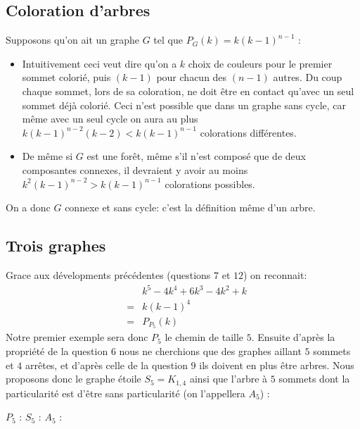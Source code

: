 \subsection{Coloration d'arbres}
Supposons qu'on ait un graphe $G$ tel que $P_G(k) = k(k-1)^{n-1}$ :
\begin {itemize}
\item Intuitivement ceci veut dire qu'on a $k$ choix de couleurs pour le premier sommet colorié, puis $(k-1)$ pour chacun des $(n-1)$ autres. Du coup chaque sommet, lors de sa coloration, ne doit être en contact qu'avec un seul sommet déjà colorié. Ceci n'est possible que dans un graphe sans cycle, car même avec un seul cycle on aura au plus $k(k-1)^{n-2}(k-2) < k(k-1)^{n-1}$ colorations différentes.
\item De même si $G$ est une forêt, même s'il n'est composé que de deux composantes connexes, il devraient y avoir au moins $k^2(k-1)^{n-2} > k(k-1)^{n-1}$ colorations possibles.
\end {itemize}
On a donc $G$ connexe et sans cycle: c'est la définition même d'un arbre.

\subsection{Trois graphes}
Grace aux dévelopments précédentes (questions $7$ et $12$) on reconnait:
\begin{eqnarray*}
&&		k^5 - 4k^4 + 6k^3 - 4k^2 + k 	\\	
&=&		k(k-1)^4						\\
&=&		P_{P_5}(k)						
\end{eqnarray*}
Notre premier exemple sera donc $P_5$ le chemin de taille $5$. Ensuite d'après la propriété de la question $6$ nous ne cherchions que des graphes aillant $5$ sommets et $4$ arrêtes, et d'après celle de la question $9$ ils doivent en plus être arbres. Nous proposons donc le graphe étoile $S_5 = K_{1,4}$ ainsi que l'arbre à $5$ sommets dont la particularité est d'être sans particularité (on l'appellera $A_5$) :

\begin{center}
$P_5$ :  \hspace{1cm}
$S_5$ :  \hspace{1cm}
$A_5$ : 
\end{center}

